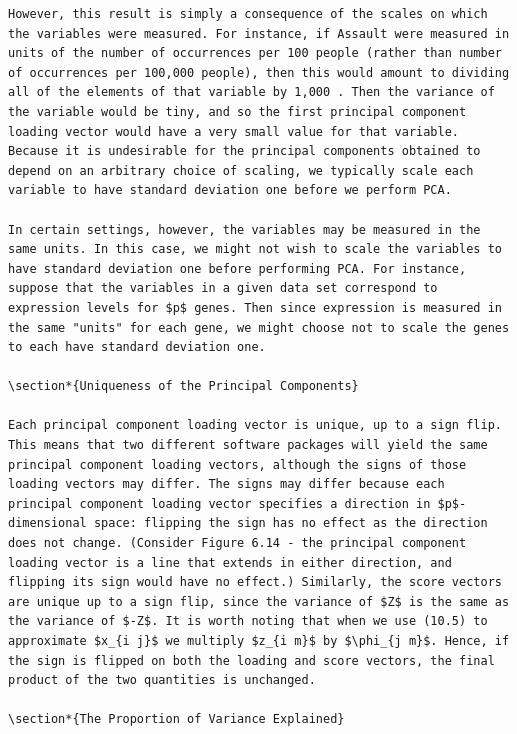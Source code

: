 \documentclass[10pt]{article}
\begin{document}
\begin{verbatim}
However, this result is simply a consequence of the scales on which the variables were measured. For instance, if Assault were measured in units of the number of occurrences per 100 people (rather than number of occurrences per 100,000 people), then this would amount to dividing all of the elements of that variable by 1,000 . Then the variance of the variable would be tiny, and so the first principal component loading vector would have a very small value for that variable. Because it is undesirable for the principal components obtained to depend on an arbitrary choice of scaling, we typically scale each variable to have standard deviation one before we perform PCA.

In certain settings, however, the variables may be measured in the same units. In this case, we might not wish to scale the variables to have standard deviation one before performing PCA. For instance, suppose that the variables in a given data set correspond to expression levels for $p$ genes. Then since expression is measured in the same "units" for each gene, we might choose not to scale the genes to each have standard deviation one.

\section*{Uniqueness of the Principal Components}

Each principal component loading vector is unique, up to a sign flip. This means that two different software packages will yield the same principal component loading vectors, although the signs of those loading vectors may differ. The signs may differ because each principal component loading vector specifies a direction in $p$-dimensional space: flipping the sign has no effect as the direction does not change. (Consider Figure 6.14 - the principal component loading vector is a line that extends in either direction, and flipping its sign would have no effect.) Similarly, the score vectors are unique up to a sign flip, since the variance of $Z$ is the same as the variance of $-Z$. It is worth noting that when we use (10.5) to approximate $x_{i j}$ we multiply $z_{i m}$ by $\phi_{j m}$. Hence, if the sign is flipped on both the loading and score vectors, the final product of the two quantities is unchanged.

\section*{The Proportion of Variance Explained}


\end{verbatim}
\end{document}
